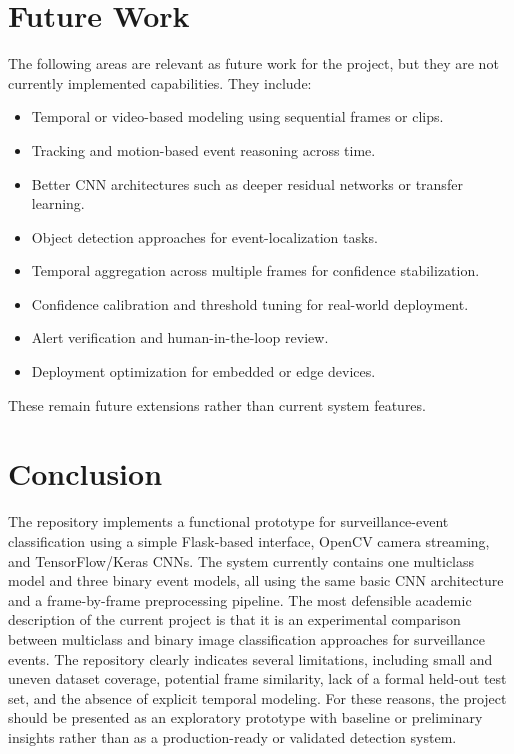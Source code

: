 \documentclass[11pt,a4paper]{article}
\begin{document}
\section{Future Work}
The following areas are relevant as future work for the project, but they are not currently implemented capabilities. They include:
\begin{itemize}[leftmargin=1.5em]
    \item Temporal or video-based modeling using sequential frames or clips.
    \item Tracking and motion-based event reasoning across time.
    \item Better CNN architectures such as deeper residual networks or transfer learning.
    \item Object detection approaches for event-localization tasks.
    \item Temporal aggregation across multiple frames for confidence stabilization.
    \item Confidence calibration and threshold tuning for real-world deployment.
    \item Alert verification and human-in-the-loop review.
    \item Deployment optimization for embedded or edge devices.
\end{itemize}
These remain future extensions rather than current system features.

\section{Conclusion}
The repository implements a functional prototype for surveillance-event classification using a simple Flask-based interface, OpenCV camera streaming, and TensorFlow/Keras CNNs. The system currently contains one multiclass model and three binary event models, all using the same basic CNN architecture and a frame-by-frame preprocessing pipeline. The most defensible academic description of the current project is that it is an experimental comparison between multiclass and binary image classification approaches for surveillance events. The repository clearly indicates several limitations, including small and uneven dataset coverage, potential frame similarity, lack of a formal held-out test set, and the absence of explicit temporal modeling. For these reasons, the project should be presented as an exploratory prototype with baseline or preliminary insights rather than as a production-ready or validated detection system.
\end{document}
